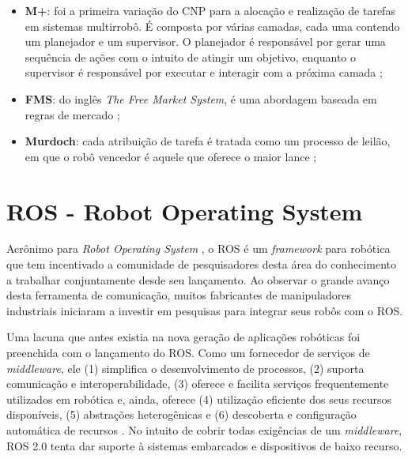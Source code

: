                 \begin{itemize}
                    \item \textbf{M+}: foi a primeira variação do CNP para a alocação e realização de tarefas em sistemas multirrobô. É composta por várias camadas, cada uma contendo um planejador e um supervisor. O planejador é responsável por gerar uma sequência de ações com o intuito de atingir um objetivo, enquanto o supervisor é responsável por executar e interagir com a próxima camada \cite{ref:botelho1999m+};
                    
                    \item \textbf{FMS}: do inglês \textit{The Free Market System}, é uma abordagem baseada em regras de mercado \cite{ref:dias2000fms};
                    
                    \item \textbf{Murdoch}: cada atribuição de tarefa é tratada como um processo de leilão, em que o robô vencedor é aquele que oferece o maior lance \cite{ref:gerkey2002murdoch};
                \end{itemize}
                
    \section{ROS - Robot Operating System} \label{sec:ros}
        Acrônimo para \textit{Robot Operating System} \cite{ref:quigley2009ros}, o ROS é um \textit{framework} para robótica que tem incentivado a comunidade de pesquisadores desta área do conhecimento a trabalhar conjuntamente desde seu lançamento. Ao observar o grande avanço desta ferramenta de comunicação, muitos fabricantes de manipuladores industriais iniciaram a investir em pesquisas para integrar seus robôs com o ROS. 
        
        Uma lacuna que antes existia na nova geração de aplicações robóticas foi preenchida com o lançamento do ROS. Como um fornecedor de serviços de \textit{middleware}, ele (1) simplifica o desenvolvimento de processos, (2) suporta comunicação e interoperabilidade, (3) oferece e facilita serviços frequentemente utilizados em robótica e, ainda, oferece (4) utilização eficiente dos seus recursos disponíveis, (5) abstrações heterogênicas e (6) descoberta e configuração automática de recursos \cite{ref:quigley2009ros}. No intuito de cobrir todas exigências de um \textit{middleware}, ROS 2.0 tenta dar suporte à sistemas embarcados e dispositivos de baixo recurso.
    
